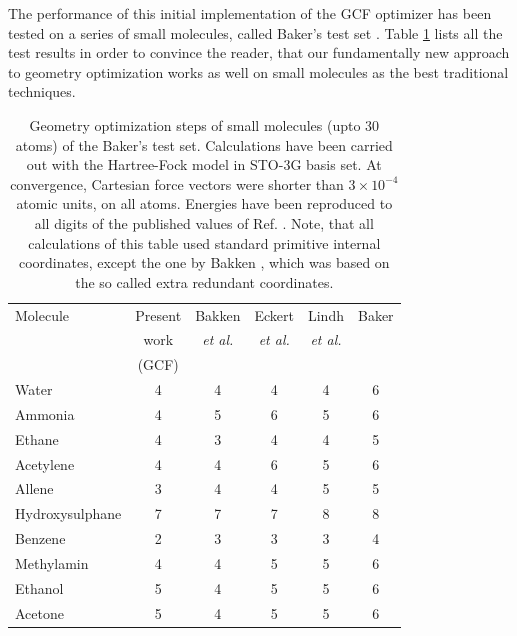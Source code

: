 \documentclass[prl,aps,twocolumn,showpacs,twocolumngrid,superbib]{revtex4}
\begin{document}
The performance of this initial implementation of the GCF optimizer
has been tested on a 
series of small molecules, called Baker's test set \cite{bakerstest}.
Table \ref{Bakers_test} lists all the test results
in order to convince
the reader, that our fundamentally new approach to geometry optimization
works as well on small molecules as the best traditional techniques.
\begin{table}[h]
\squeezetable
\caption{
Geometry optimization steps of small molecules (upto 30 atoms)
of the Baker's test set. Calculations have been carried out 
with the Hartree-Fock model in STO-3G basis set.
At convergence, Cartesian force vectors were shorter 
than $3\times10^{-4}$ atomic units, on all atoms. Energies have been
reproduced to all digits of the published values 
of Ref. \cite{bakerstest}.
Note, that all calculations of this table used standard primitive 
internal coordinates, except the one by Bakken \cite{bakken}, 
which was based on the so called extra redundant coordinates.
}
\label{Bakers_test}
\begin{tabular}{lccccc}
\toprule
Molecule               & Present  & Bakken & Eckert  & Lindh &  Baker  \\
         & work & {\it{et al.}} & {\it{et al.}} & {\it{et al.}} &    \\
         &(GCF) &  \cite{bakken} &  \cite{eckert} & \cite{lindh} &  \cite{bakerstest} \\
\colrule
Water                  &   4    &   4    &    4    &    4   &   6     \\
Ammonia                &   4    &   5    &    6    &    5   &   6     \\
Ethane                 &   4    &   3    &    4    &    4   &   5     \\
Acetylene              &   4    &   4    &    6    &    5   &   6     \\
Allene                 &   3    &   4    &    4    &    5   &   5     \\
Hydroxysulphane        &   7    &   7    &    7    &    8   &   8     \\
Benzene                &   2    &   3    &    3    &    3   &   4     \\
Methylamin             &   4    &   4    &    5    &    5   &   6     \\
Ethanol                &   5    &   4    &    5    &    5   &   6     \\
Acetone                &   5    &   4    &    5    &    5   &   6     \\

\end{tabular}
\end{table}
\end{document}
